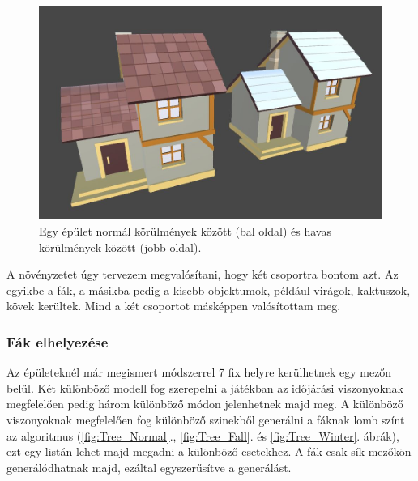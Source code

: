 \begin{figure}[h!]
\centering
\includegraphics[scale=0.25]{kepek/Buildings.JPG}
\caption[épület]{Egy épület normál körülmények között (bal oldal) és havas körülmények között (jobb oldal). \footnotemark}
\label{fig:Buildings}
\end{figure}



A növényzetet úgy tervezem megvalósítani, hogy két csoportra bontom azt. Az egyikbe a fák, a másikba pedig a kisebb objektumok, például virágok, kaktuszok, kövek kerültek. Mind a két csoportot másképpen valósítottam meg.

\subsubsection{Fák elhelyezése}

Az épületeknél már megismert módszerrel 7 fix helyre kerülhetnek egy mezőn belül. Két különböző modell fog szerepelni a játékban az időjárási viszonyoknak megfelelően pedig három különböző módon jelenhetnek majd meg. A különböző viszonyoknak megfelelően fog különböző szinekből generálni a fáknak lomb színt az algoritmus (\ref{fig:Tree_Normal}., \ref{fig:Tree_Fall}. és \ref{fig:Tree_Winter}. ábrák), ezt egy listán lehet majd megadni a különböző esetekhez. A fák csak sík mezőkön generálódhatnak majd, ezáltal egyszerűsítve a generálást.

